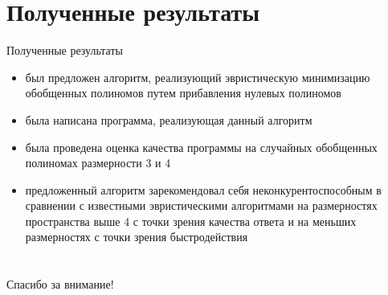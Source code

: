 \documentclass{beamer}
\begin{document}
\section[Результаты]{Полученные результаты}
\begin{frame}{Полученные результаты}

\begin{itemize}
    \item был предложен алгоритм, реализующий эвристическую минимизацию обобщенных полиномов путем прибавления нулевых полиномов
    \item была написана программа, реализующая данный алгоритм
    \item была проведена оценка качества программы на случайных обобщенных полиномах размерности 3 и 4
    \item предложенный алгоритм зарекомендовал себя неконкурентоспособным в сравнении с известными эвристическими алгоритмами на размерностях пространства выше 4 с точки зрения качества ответа и на меньших размерностях с точки зрения быстродействия
\end{itemize}

\end{frame}

\section{}
\begin{frame}
\centering \huge{Спасибо за внимание!}
\end{frame}
\end{document}
